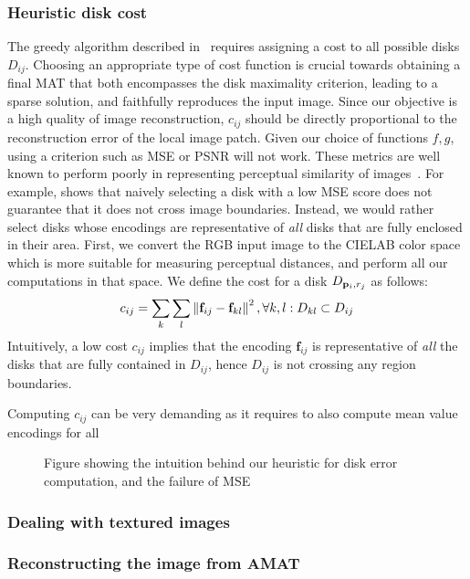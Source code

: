 \documentclass[10pt,twocolumn,letterpaper]{article}
\begin{document}
\subsubsection*{Heuristic disk cost}
The greedy algorithm described in~ requires assigning a cost to all possible disks $D_{ij}$.
Choosing an appropriate type of cost function is crucial towards obtaining a final MAT that both encompasses the 
disk maximality criterion, leading to a sparse solution, and faithfully reproduces the input image.
Since our objective is a high quality of image reconstruction, $c_{ij}$ should be directly proportional
to the reconstruction error of the local image patch.
Given our choice of functions $f,g$, using a criterion such as MSE or PSNR will not work.
These metrics are well known to perform poorly in representing perceptual similarity of images~\cite{girod1993what,wang2009mean}.
For example,  shows that naively selecting a disk with a low MSE score does not guarantee that it 
does not cross image boundaries.
Instead, we would rather select disks whose encodings are representative of \emph{all} disks that are fully enclosed
in their area. 
First, we convert the RGB input image to the CIELAB color space which is more suitable for measuring perceptual distances,
and perform all our computations in that space.
We define the cost for a disk $D_{\mathbf{p}_{i},r_j}$ as follows:
\begin{equation}
c_{ij} = \sum_k \sum_l \left \lVert \mathbf{f}_{ij} - \mathbf{f}_{kl}  \right \rVert^2, \forall k,l: D_{kl} \subset D_{ij}
\label{eq:diskcost}
\end{equation}
Intuitively, a low cost $c_{ij}$ implies that the encoding $\mathbf{f}_{ij}$ is representative of \emph{all}
the disks that are fully contained in $D_{ij}$, hence $D_{ij}$ is not crossing any region boundaries.

Computing $c_{ij}$ can be very demanding as it requires to also compute mean value encodings for all


\begin{figure}
\caption{Figure showing the intuition behind our heuristic for disk error computation, and the failure of MSE}
\label{fig:heuristic}
\end{figure}


\subsubsection*{Dealing with textured images}
\subsubsection*{Reconstructing the image from AMAT}
\end{document}
